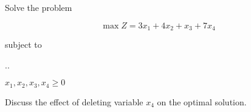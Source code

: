 \documentclass[../main.tex]{subfiles}
\begin{document}

\begin{questions}
  \question %
  
Solve the problem

\[ \max Z = 3x_1 + 4x_2 + x_3 + 7x_4\]

{\centering
  subject to
  \vspace{2mm}

  \sysdelim..%
  \vspace{2mm}

  $x_1, x_2, x_3, x_4 \geq 0$
  \par}

\vspace{3mm}

Discuss the effect of deleting variable $x_4$ on the optimal solution.
\end{questions}
\end{document}

